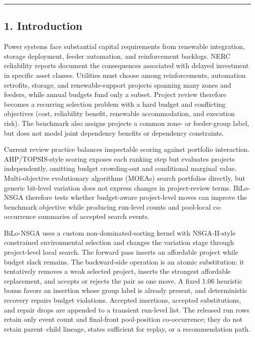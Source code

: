 \documentclass[
]{article}
\begin{document}
\begin{center}\rule{0.5\linewidth}{0.5pt}\end{center}

\subsection{1. Introduction}\label{introduction}

Power systems face substantial capital requirements from renewable integration, storage deployment, feeder automation, and reinforcement backlogs. NERC reliability reports document the consequences associated with delayed investment in specific asset classes. Utilities must choose among reinforcements, automation retrofits, storage, and renewable-support projects spanning many zones and feeders, while annual budgets fund only a subset. Project review therefore becomes a recurring selection problem with a hard budget and conflicting objectives (cost, reliability benefit, renewable accommodation, and execution risk). The benchmark also assigns projects a common zone- or feeder-group label, but does not model joint dependency benefits or dependency constraints.

Current review practice balances inspectable scoring against portfolio interaction. AHP/TOPSIS-style scoring exposes each ranking step but evaluates projects independently, omitting budget crowding-out and conditional marginal value. Multi-objective evolutionary algorithms (MOEAs) search portfolios directly, but generic bit-level variation does not express changes in project-review terms. BiLo-NSGA therefore tests whether budget-aware project-level moves can improve the benchmark objective while producing run-level counts and pool-local co-occurrence summaries of accepted search events.

BiLo-NSGA uses a custom non-dominated-sorting kernel with NSGA-II-style constrained environmental selection and changes the variation stage through project-level local search. The forward pass inserts an affordable project while budget slack remains. The backward-side operation is an atomic substitution: it tentatively removes a weak selected project, inserts the strongest affordable replacement, and accepts or rejects the pair as one move. A fixed 1.06 heuristic bonus favors an insertion whose group label is already present, and deterministic recovery repairs budget violations. Accepted insertions, accepted substitutions, and repair drops are appended to a transient run-level list. The released run rows retain only event count and final-front pool-position co-occurrence; they do not retain parent--child lineage, states sufficient for replay, or a recommendation path.
\end{document}
